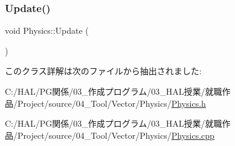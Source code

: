 \subsubsection{\texorpdfstring{Update()}{Update()}}
{\footnotesize\ttfamily void Physics\+::\+Update (\begin{DoxyParamCaption}{ }\end{DoxyParamCaption})}



このクラス詳解は次のファイルから抽出されました\+:\begin{DoxyCompactItemize}
\item 
C\+:/\+H\+A\+L/\+P\+G関係/03\+\_\+作成プログラム/03\+\_\+\+H\+A\+L授業/就職作品/\+Project/source/04\+\_\+\+Tool/\+Vector/\+Physics/\mbox{\hyperlink{_physics_8h}{Physics.\+h}}\item 
C\+:/\+H\+A\+L/\+P\+G関係/03\+\_\+作成プログラム/03\+\_\+\+H\+A\+L授業/就職作品/\+Project/source/04\+\_\+\+Tool/\+Vector/\+Physics/\mbox{\hyperlink{_physics_8cpp}{Physics.\+cpp}}\end{DoxyCompactItemize}
